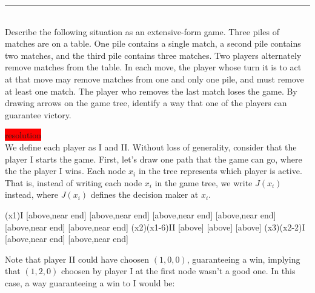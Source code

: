 \documentclass[10pt]{report}
\newenvironment{exercise}[1]
    {\vspace{0.5cm}\hrule\vspace{0.5cm}\noindent\fbox{#1}\\}
    {\vspace{0.5cm}}
\newenvironment{response}
{\vspace{0.2cm}\noindent\colorbox{red}{resolution}}
    {\vspace{0.5cm}}
\begin{document}
\begin{exercise}{3.1}
	Describe the following situation as an extensive-form game. Three piles of matches are on a table. One pile contains a single match, a second pile contains two matches, and the third pile contains three matches. Two players alternately remove matches from the table. In each move, the player whose turn it is to act at that move may remove matches from one and only one pile, and must remove at least one match. The player who removes the last match loses the game. By drawing arrows on the game tree, identify a way that one of the players can guarantee victory.

	\begin{response}\\
		We define each player as I and II. Without loss of generality, consider that the player I starts the game. First, let's draw one path that the game can go, where the the player I wins. Each node $x_{i}$ in the tree represents which player is active. That is, instead of writing each node $ x_{i} $ in the game tree, we write $J(x_{i})$ instead, where $ J(x_{i}) $ defines the decision maker at $ x_{i} $.

		\vspace{0.5cm}
		\begin{istgame}[sloped,font=\tiny]
			\setistOvalNodeStyle{.6cm}
			\xtShowEndPoints[oval node, minimum size=6pt]
			\xtdistance{40mm}{10mm}
			\istrooto[right](x1){I}
			[above,near end]
			[above,near end]
			[above,near end]
			[above,near end]
			[above,near end]
			[above,near end]
			\endist
			\istrooto[right](x2)(x1-6){II}
			[above]
			[above]
			[above]
			\endist
			\istrooto[right](x3)(x2-2){I}
			[above,near end]{}
			[above,near end]{}
			\endist
		\end{istgame}

		Note that player II could have choosen $ (1,0,0) $, guaranteeing a win, implying that $ (1,2,0) $ choosen by player I at the first node wasn't a good one. In this case, a way guaranteeing a win to I would be:


\end{response}
\end{exercise}
\end{document}
